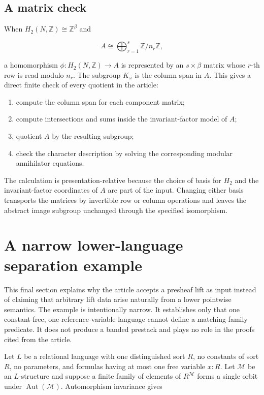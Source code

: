 \subsection{A matrix check}

When \(H_2(N,\mathbb Z)\cong\mathbb Z^\beta\) and

\[
 A\cong\bigoplus_{r=1}^s\mathbb Z/n_r\mathbb Z,
\]

a homomorphism \(\phi:H_2(N,\mathbb Z)\to A\) is represented by an
\(s\times\beta\) matrix whose \(r\)-th row is read modulo \(n_r\).  The
subgroup \(K_\omega\) is the column span in \(A\).  This gives a direct
finite check of every quotient in the article:

\begin{enumerate}[label=(\roman*),nosep]
\item compute the column span for each component matrix;
\item compute intersections and sums inside the invariant-factor model of
      \(A\);
\item quotient \(A\) by the resulting subgroup;
\item check the character description by solving the corresponding modular
      annihilator equations.
\end{enumerate}

The calculation is presentation-relative because the choice of basis for
\(H_2\) and the invariant-factor coordinates of \(A\) are part of the input.
Changing either basis transports the matrices by invertible row or column
operations and leaves the abstract image subgroup unchanged through the
specified isomorphism.

\section{A narrow lower-language separation example}
\label{sec:auxiliary-separation}

This final section explains why the article accepts a presheaf lift as input
instead of claiming that arbitrary lift data arise naturally from a lower
pointwise semantics.  The example is intentionally narrow.  It establishes
only that one constant-free, one-reference-variable language cannot define a
matching-family predicate.  It does not produce a banded prestack and plays
no role in the proofs cited from the article.

Let \(L\) be a relational language with one distinguished sort \(R\), no
constants of sort \(R\), no parameters, and formulas having at most one free
variable \(x:R\).  Let \(\mathcal M\) be an \(L\)-structure and suppose a
finite family of elements of \(R^\mathcal M\) forms a single orbit under
\(\operatorname{Aut}(\mathcal M)\).  Automorphism invariance gives

